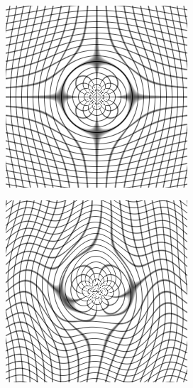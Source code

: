\begin{figure}[H]
\begin{subfigure}[t]{0.3\textwidth}
	  \label{fig:ref-image}
	\end{subfigure} \\
	\begin{subfigure}[t]{0.3\textwidth}
	  \includegraphics[width=\textwidth]{figuras/gridDist.png}
	  \label{fig:sin-image}
	\end{subfigure}
	\begin{subfigure}[t]{0.3\textwidth}
	  \includegraphics[width=\textwidth]{figuras/movingImageDistSin.png}

\end{subfigure}
\end{figure}
